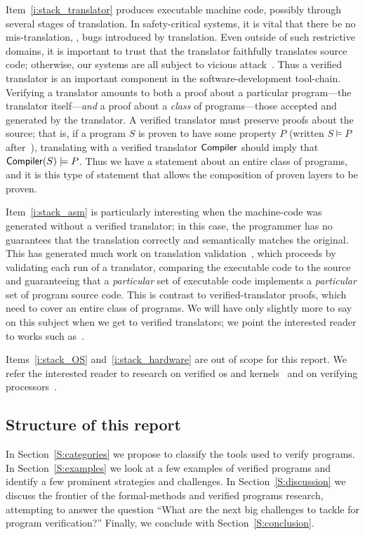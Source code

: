 Item~\ref{i:stack_translator} produces executable machine code, possibly through
several stages of translation. In safety-critical systems, it is vital that
there be no mis-translation, \ie, bugs introduced by translation. Even outside
of such restrictive domains, it is important to trust that the translator
faithfully translates source code; otherwise, our systems are all subject to
vicious attack~\cite{Thompson_1984}. Thus a verified translator is an important
component in the software-development tool-chain. Verifying a translator amounts
to both a proof about a particular program---the translator itself---\emph{and}
a proof about a \emph{class} of programs---those accepted and generated by the
translator. A verified translator must preserve proofs about the source; that
is, if a program \(S\) is proven to have some property \(P\) (written \(S
\models P\) after~\cite{Leroy-Compcert-CACM}), translating with a verified
translator \(\mathsf{Compiler}\) should imply that \(\mathsf{Compiler}(S) \models
P\). Thus we have a statement about an entire class of programs, and it is this
type of statement that allows the composition of proven layers to be proven.

Item~\ref{i:stack_asm} is particularly interesting when the machine-code was
generated without a verified translator; in this case, the programmer has no
guarantees that the translation correctly and semantically matches the original.
This has generated much work on translation validation~\cite{Pnueli_1998}, which
proceeds by validating each run of a translator, comparing the executable code
to the source and guaranteeing that a \emph{particular} set of executable code
implements a \emph{particular} set of program source code. This is contrast to
verified-translator proofs, which need to cover an entire class of programs. We
will have only slightly more to say on this subject when we get to verified
translators; we point the interested reader to works such
as~\cite{Sewell:phd,Sewell_KH_16,Sewell_2013,Necula_2000}.

Items~\ref{i:stack_OS} and~\ref{i:stack_hardware} are out of scope for this
report. We refer the interested reader to research on verified \gls{os} and
kernels~\cite{Klein_EHACDEEKNSTW_09,Klein_AEHCDEEKNSTW_10,Klein_AEMSKH_14,Sewell_KH_16,Narayanan_2019,Narayan_2020,Nelson_2017}
and on verifying
processors~\cite{sturton-memocode13,Sturton_2013,Bradfield_2016,zhang2017identifying,zhang2018recursive,zhang2018end}.

\subsection{Structure of this report}

In Section~\ref{S:categories} we propose to classify the tools used to verify
programs. In Section~\ref{S:examples} we look at a few examples of verified
programs and identify a few prominent strategies and challenges. In
Section~\ref{S:discussion} we discuss the frontier of the formal-methods and
verified programs research, attempting to answer the question ``What are the
next big challenges to tackle for program verification?'' Finally, we conclude
with Section~\ref{S:conclusion}.
